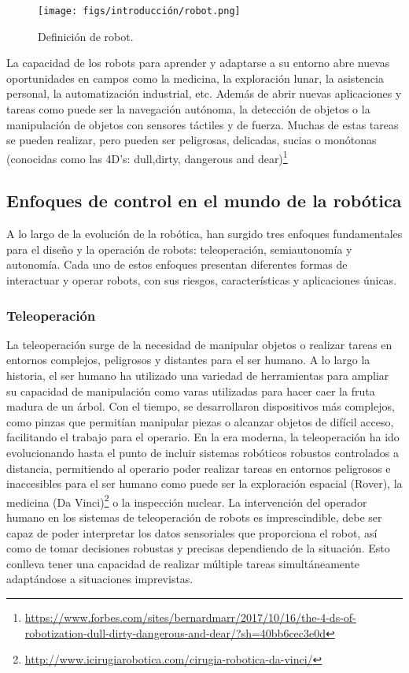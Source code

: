 \begin{figure} [H]
  \begin{center}
    \texttt{[image: figs/introducción/robot.png]}
  \end{center}
  \caption{Definición de robot.}
  \label{fig:robot}
  \vspace{-1.5em}
\end{figure}

La capacidad de los robots para aprender y adaptarse a su entorno abre nuevas oportunidades en campos como la medicina, la exploración lunar, la asistencia personal, la automatización industrial, etc. 
Además de abrir nuevas aplicaciones y tareas como puede ser la navegación autónoma, la detección de objetos o 
la manipulación de objetos con sensores táctiles y de fuerza. Muchas de estas tareas se pueden realizar, pero pueden ser peligrosas, delicadas, sucias o monótonas 
(conocidas como las 4D's: dull,dirty, dangerous and dear)\footnote{\url{https://www.forbes.com/sites/bernardmarr/2017/10/16/the-4-ds-of-robotization-dull-dirty-dangerous-and-dear/?sh=40bb6cec3e0d}}


 \subsection{Enfoques de control en el mundo de la robótica}
 \label{sec:enfoquesrobotica}
A lo largo de la evolución de la robótica, han surgido tres enfoques fundamentales para el diseño y la operación de robots: teleoperación, semiautonomía y autonomía.
Cada uno de estos enfoques presentan diferentes
formas de interactuar y operar robots, con sus riesgos, características y aplicaciones únicas. 
\subsubsection{Teleoperación}
\label{sec:subseccion}

La teleoperación surge de la necesidad de manipular objetos o realizar tareas en entornos complejos, peligrosos y distantes para el ser humano. A lo largo la historia, el ser humano
ha utilizado una variedad de herramientas para ampliar su capacidad de manipulación como varas utilizadas para hacer caer la fruta madura de un árbol. Con el tiempo, se desarrollaron 
dispositivos más complejos, como pinzas que permitían manipular piezas o alcanzar objetos de difícil acceso, facilitando el trabajo para el operario. En la era moderna, la teleoperación
ha ido evolucionando hasta el punto de incluir sistemas robóticos robustos controlados a distancia, permitiendo al operario poder realizar
tareas en entornos peligrosos e inaccesibles para el ser humano como puede ser la exploración espacial (Rover), la medicina (Da Vinci)\footnote{\url{http://www.icirugiarobotica.com/cirugia-robotica-da-vinci/}} o la inspección nuclear.
La intervención del operador humano en los sistemas de teleoperación de robots es imprescindible, debe ser capaz de poder interpretar los datos sensoriales que proporciona el robot, así como de 
tomar decisiones robustas y precisas dependiendo de la situación. Esto conlleva tener una capacidad de realizar múltiple tareas simultáneamente adaptándose a situaciones imprevistas.

